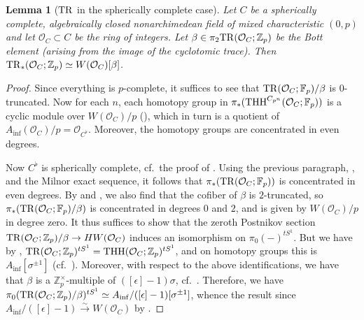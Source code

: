 \documentclass{amsart}
\newtheorem{lemma}[theorem]{Lemma}
\theoremstyle{definition}
\begin{document}
\begin{lemma}[$\mathrm{TR}$ in the spherically complete case] 
\label{TRsphcompl}
Let $C$ be a spherically complete, algebraically closed nonarchimedean field 
of mixed
characteristic $(0, p)$
and let $\mathcal{O}_C
\subset C$ be the ring of integers. 
Let $\beta \in \pi_2 \mathrm{TR}(\mathcal{O}_C; \mathbb{Z}_p)$ be the Bott element
(arising from the image of the cyclotomic trace). 
Then $\mathrm{TR}_*(\mathcal{O}_C; \mathbb{Z}_p) \simeq
W(\mathcal{O}_C)[\beta]$. 
\end{lemma} 
\begin{proof} 
Since everything is $p$-complete, 
it suffices to see that $\mathrm{TR}(\mathcal{O}_C; \mathbb{F}_p)/\beta$ is $0$-truncated. 
Now for each $n$, each homotopy group in $\pi_*(\mathrm{THH}^{C_{p^n}}(\mathcal{O}_C; \mathbb{F}_p))$
is a cyclic module over 
$W(\mathcal{O}_C)/p$ (), which in turn is a quotient of $A_{\inf}(\mathcal{O}_C)/p =
\mathcal{O}_{C^{\flat}}$. Moreover, the homotopy groups are concentrated in even
degrees. 


Now $C^{\flat}$ is
spherically complete, cf.~the proof of \cite[Lem.~3.23]{BMS1}. 
Using the previous paragraph, 
,
and the Milnor exact sequence, it follows that 
$\pi_*( \mathrm{TR}( \mathcal{O}_C; \mathbb{F}_p))$ is 
concentrated in even degrees. 
By 
 and 
, we also find that 
the cofiber of $\beta$ is $2$-truncated, so 
$\pi_*( \mathrm{TR}( \mathcal{O}_C; \mathbb{F}_p)/\beta)$ is concentrated in degrees $0$
and $2$, and is given by $W(\mathcal{O}_C)/p$ in degree zero. 
It thus suffices to show that 
the zeroth Postnikov section
$\mathrm{TR}(\mathcal{O}_C; \mathbb{Z}_p)/\beta \to H W(\mathcal{O}_C)$
induces an isomorphism on $\pi_0 (-)^{tS^1}$. 
But we have by 
\cite[Cor.~10]{AN}, 
$\mathrm{TR}(\mathcal{O}_C; \mathbb{Z}_p)^{tS^1} = \mathrm{THH}(\mathcal{O}_C;
\mathbb{Z}_p)^{tS^1}$, and on homotopy groups this is 
$A_{\inf}[\sigma^{\pm 1}]$ (cf.~\cite[Sec.~6]{BMS2}). 
Moreover, 
with respect to the above identifications, we have
that $\beta$ is a $\mathbb{Z}_p^{\times}$-multiple of 
$( [\epsilon] -1 )\sigma$, cf.~\cite[Th.~1.3.6]{HN}. 
Therefore, we have
$ \pi_0 ( \mathrm{TR}(\mathcal{O}_C; \mathbb{Z}_p)/\beta )^{tS^1} \simeq A_{\mathrm{inf}}/(
[\epsilon] - 1) [\sigma^{\pm
1}]$, whence the result since 
$A_{\inf}/( [\epsilon] -1 ) \xrightarrow{\sim} W(\mathcal{O}_C)$ by
\cite[Lem.~3.23]{BMS1}. 
\end{proof} 
\end{document}
